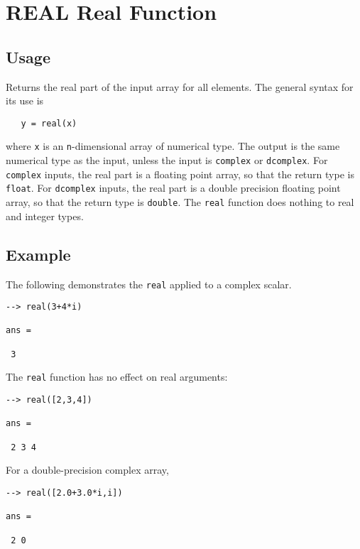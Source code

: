 \section{REAL Real Function}

\subsection{Usage}

Returns the real part of the input array for all elements.  The 
general syntax for its use is
\begin{verbatim}
   y = real(x)
\end{verbatim}
where \verb|x| is an \verb|n|-dimensional array of numerical type.  The output 
is the same numerical type as the input, unless the input is \verb|complex|
or \verb|dcomplex|.  For \verb|complex| inputs, the real part is a floating
point array, so that the return type is \verb|float|.  For \verb|dcomplex|
inputs, the real part is a double precision floating point array, so that
the return type is \verb|double|.  The \verb|real| function does
nothing to real and integer types.
\subsection{Example}

The following demonstrates the \verb|real| applied to a complex scalar.
\begin{verbatim}
--> real(3+4*i)

ans = 

 3 
\end{verbatim}
The \verb|real| function has no effect on real arguments:
\begin{verbatim}
--> real([2,3,4])

ans = 

 2 3 4 
\end{verbatim}
For a double-precision complex array,
\begin{verbatim}
--> real([2.0+3.0*i,i])

ans = 

 2 0 
\end{verbatim}
